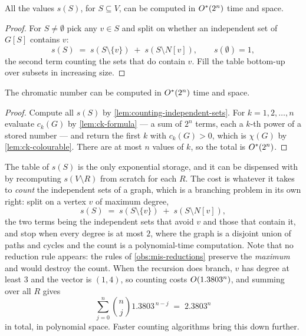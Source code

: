\begin{lemma}\label{lem:counting-independent-sets}
All the values $s(S)$, for $S \subseteq V$, can be computed in $O^{*}(2^n)$
time and space.
\end{lemma}

\begin{proof}
For $S \ne \emptyset$ pick any $v \in S$ and split on whether an independent set
of $G[S]$ contains $v$:
\[ s(S) \;=\; s(S \setminus \{v\}) \;+\; s(S \setminus N[v]), \qquad
   s(\emptyset) = 1, \]
the second term counting the sets that do contain $v$. Fill the table bottom-up
over subsets in increasing size.
\end{proof}

\begin{theorem}\label{thm:ie-colouring}
The chromatic number can be computed in $O^{*}(2^n)$ time and space.
\end{theorem}

\begin{proof}
Compute all $s(S)$ by \cref{lem:counting-independent-sets}. For
$k = 1, 2, \ldots, n$ evaluate $c_k(G)$ by \cref{lem:ck-formula} --- a sum of
$2^n$ terms, each a $k$-th power of a stored number --- and return the first $k$
with $c_k(G) > 0$, which is $\chi(G)$ by \cref{lem:ck-colourable}. There are at
most $n$ values of $k$, so the total is $O^{*}(2^n)$.
\end{proof}

\begin{remark}\label{rem:colouring-poly-space}
The table of $s(S)$ is the only exponential storage, and it can be dispensed
with by recomputing $s(V \setminus R)$ from scratch for each $R$. The cost is
whatever it takes to \emph{count} the independent sets of a graph, which is a
branching problem in its own right: split on a vertex $v$ of maximum degree,
\[ s(S) \;=\; s(S \setminus \{v\}) \;+\; s(S \setminus N[v]), \]
the two terms being the independent sets that avoid $v$ and those that contain
it, and stop when every degree is at most $2$, where the graph is a disjoint
union of paths and cycles and the count is a polynomial-time computation. Note
that no reduction rule appears: the rules of \cref{obs:mis-reductions} preserve
the \emph{maximum} and would destroy the count. When the recursion does branch,
$v$ has degree at least $3$ and the vector is $(1,4)$, so counting costs
$O\!\left(1.3803^n\right)$, and summing over all $R$ gives
\[ \sum_{j=0}^{n} \binom{n}{j} 1.3803^{\,n-j} \;=\; 2.3803^n \]
in total, in polynomial space. Faster counting algorithms bring this down
further.
\end{remark}

